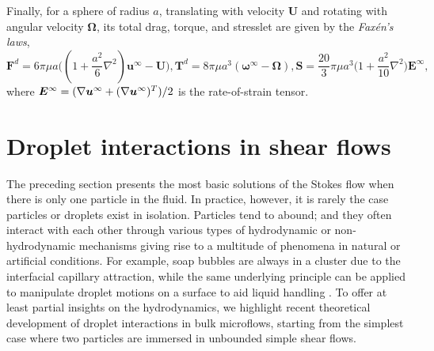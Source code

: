 Finally, for a sphere of radius $a$, translating with velocity $\bm U$ and rotating with angular velocity $\bm \Omega$, its total drag, torque, and stresslet are given by the \emph{Fax\'{e}n's laws},
\begin{subequations} \label{eq:faxen}
 \begin{equation}
   {\bm F}^{d} = 6\pi\mu a\bigg( (1+\frac{a^2}{6}\nabla^2){\bm u^\infty - {\bm U}} \bigg) ,
 \end{equation}
 \begin{equation}
  {\bm T}^{d} = 8\pi\mu a^3 ({\bm \omega}^\infty - {\bm \Omega}),
 \end{equation}
 \begin{equation}
   {\bm S} = \frac{20}{3}\pi\mu a^3 \bigg( 1+\frac{a^2}{10}\nabla^2 \bigg) {\bm E}^\infty ,
 \end{equation}
\end{subequations}
where $\small {\bm E}^\infty=(\nabla {\bm u}^\infty + (\nabla {\bm u}^\infty)^T)/2$ is the rate-of-strain tensor.


\section{Droplet interactions in shear flows}

The preceding section presents the most basic solutions of the Stokes flow when there is only one particle in the fluid.
In practice, however, it is rarely the case particles or droplets exist in isolation.
Particles tend to abound; and they often interact with each other through various types of hydrodynamic or non-hydrodynamic mechanisms giving rise to a multitude of phenomena in natural or artificial conditions.
For example, soap bubbles are always in a cluster due to the interfacial capillary attraction, while the same underlying principle can be applied to manipulate droplet motions on a surface to aid liquid handling \citep{vapour-sensing}.
To offer at least partial insights on the hydrodynamics, we highlight recent theoretical development of droplet interactions in bulk microflows, starting from the simplest case where two particles are immersed in unbounded simple shear flows.

